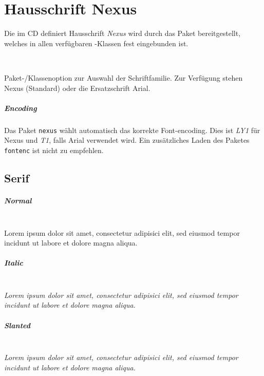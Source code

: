 \chapter{Hausschrift Nexus}\label{chap:nexus}

Die im \acs{CD} definiert Hausschrift \emph{Nexus} wird durch das Paket
 bereitgestellt, welches in allen verfügbaren \tubslatex-Klassen
fest eingebunden ist.

\begin{Declaration}
  \\
\end{Declaration}

Paket-/Klassenoption zur Auswahl der Schriftfamilie.
Zur Verfügung stehen Nexus (Standard) oder die Ersatzschrift Arial.

\paragraph{Encoding}

Das Paket \texttt{nexus} wählt automatisch das korrekte Font-encoding.
Dies ist \emph{LY1} für Nexus und \emph{T1}, falls Arial verwendet wird.
Ein zusätzliches Laden des Paketes \texttt{fontenc} ist nicht zu empfehlen.

\section*{Serif}

\paragraph{Normal}\hfill\\
{
Lorem ipsum dolor sit amet, consectetur adipisici elit, sed eiusmod tempor
incidunt ut labore et dolore magna aliqua.}
\paragraph{Italic}\hfill\\
{\itshape
Lorem ipsum dolor sit amet, consectetur adipisici elit, sed eiusmod tempor
incidunt ut labore et dolore magna aliqua.}
\paragraph{Slanted}\hfill\\
{\slshape
Lorem ipsum dolor sit amet, consectetur adipisici elit, sed eiusmod tempor
incidunt ut labore et dolore magna aliqua.}
